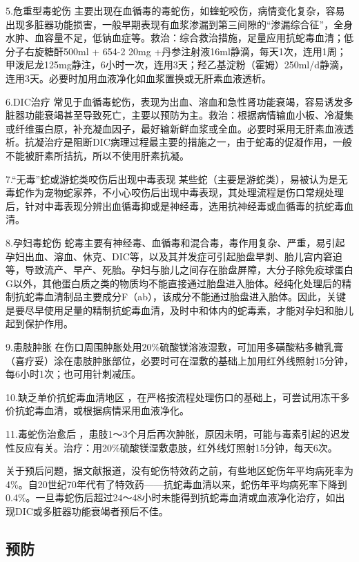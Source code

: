 5.危重型毒蛇伤
主要出现在血循毒的毒蛇伤，如蝰蛇咬伤，病情变化复杂，容易出现多脏器功能损害，一般早期表现有血浆渗漏到第三间隙的“渗漏综合征”，全身水肿、血容量不足，低钠血症等。救治：综合救治措施，足量应用抗蛇毒血清；低分子右旋糖酐500ml
+ 654-2 20mg
+丹参注射液16ml静滴，每天1次，连用1周；甲泼尼龙125mg静注，6小时一次，连用3天；羟乙基淀粉（霍姆）250ml/d静滴，连用3天。必要时加用血液净化如血浆置换或无肝素血液透析。

6.DIC治疗
常见于血循毒蛇伤，表现为出血、溶血和急性肾功能衰竭，容易诱发多脏器功能衰竭甚至导致死亡，主要以预防为主。救治：根据病情输血小板、冷凝集或纤维蛋白原，补充凝血因子，最好输新鲜血浆或全血。必要时采用无肝素血液透析。抗凝治疗是阻断DIC病理过程最主要的措施之一，由于蛇毒的促凝作用，一般不能被肝素所拮抗，所以不使用肝素抗凝。

7.“无毒”蛇或游蛇类咬伤后出现中毒表现
某些蛇（主要是游蛇类），易被认为是无毒蛇作为宠物蛇家养，不小心咬伤后出现中毒表现，其处理流程是伤口常规处理后，针对中毒表现分辨出血循毒抑或是神经毒，选用抗神经毒或血循毒的抗蛇毒血清。

8.孕妇毒蛇伤
蛇毒主要有神经毒、血循毒和混合毒，毒作用复杂、严重，易引起孕妇出血、溶血、休克、DIC等，以及其并发症可引起胎盘早剥、胎儿宫内窘迫等，导致流产、早产、死胎。孕妇与胎儿之间存在胎盘屏障，大分子除免疫球蛋白G以外，其他蛋白质之类的物质均不能直接通过胎盘进入胎体。经纯化处理后的精制抗蛇毒血清制品主要成分F（ab），该成分不能通过胎盘进入胎体。因此，关键是要尽早使用足量的精制抗蛇毒血清，及时中和体内的蛇毒素，才能对孕妇和胎儿起到保护作用。

9.患肢肿胀
在伤口周围肿胀处用20\%硫酸镁溶液湿敷，可加用多磺酸粘多糖乳膏（喜疗妥）涂在患肢肿胀部位，必要时可在湿敷的基础上加用红外线照射15分钟，每6小时1次；也可用针刺减压。

10.缺乏单价抗蛇毒血清地区
，在严格按流程处理伤口的基础上，可尝试用冻干多价抗蛇毒血清，或根据病情采用血液净化。

11.毒蛇伤治愈后
，患肢1～3个月后再次肿胀，原因未明，可能与毒素引起的迟发性反应有关。治疗：用20\%硫酸镁湿敷患肢，红外线灯照射15分钟，每天6次。

关于预后问题，据文献报道，没有蛇伤特效药之前，有些地区蛇伤年平均病死率为4\%。自20世纪70年代有了特效药------抗蛇毒血清以来，蛇伤年平均病死率下降到0.4\%。一旦毒蛇伤后超过24～48小时未能得到抗蛇毒血清或血液净化治疗，如出现DIC或多脏器功能衰竭者预后不佳。

\subsection{预防}

